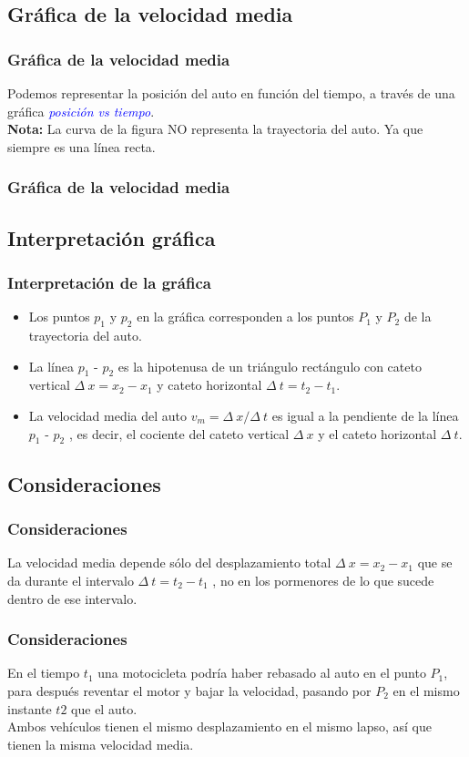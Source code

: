 \subsection*{Gráfica de la velocidad media}
\begin{frame}
\frametitle{Gráfica de la velocidad media}
Podemos representar la posición del auto en función del tiempo, a través de una gráfica \textcolor{blue}{\emph{posición vs tiempo}}.
\\
\bigskip
\pause
\textbf{Nota: } La curva de la figura NO representa la trayectoria del auto. Ya que siempre es una línea recta.
\end{frame}
\begin{frame}[plain]
\frametitle{Gráfica de la velocidad media}
\begin{figure}
    \centering
    
\end{figure}
\end{frame}
\subsection{Interpretación gráfica}
\begin{frame}
\frametitle{Interpretación de la gráfica}
\begin{itemize}[<+->]
\item Los puntos $p_{1}$ y $p_{2}$ en la gráfica corresponden a los puntos $P_{1}$ y $P_{2}$ de la trayectoria del auto.
\item La línea $p_{1}$ - $p_{2}$ es la hipotenusa de un triángulo rectángulo con cateto vertical $\Delta \: x = x_{2} - x_{1}$ y cateto horizontal $\Delta \: t = t_{2} - t_{1}$.
\item La velocidad media del auto $v_{m} = \Delta \: x / \Delta \: t$ es igual a la pendiente de la línea $p_{1}$ - $p_{2}$ , es decir, el cociente del cateto vertical $\Delta \: x$ y el cateto horizontal $\Delta \: t$.
\end{itemize}
\end{frame}
\subsection*{Consideraciones}
\begin{frame}
\frametitle{Consideraciones}
La velocidad media depende sólo del desplazamiento total $\Delta \: x = x_{2} - x_{1}$ que se da durante el intervalo $\Delta \: t = t_{2} - t_{1}$ , no en los pormenores de lo que sucede dentro de ese intervalo.
\end{frame}
\begin{frame}
\frametitle{Consideraciones}
En el tiempo $t_{1}$ una motocicleta podría haber rebasado al auto en el punto $P_{1}$, para después reventar el motor y bajar la velocidad, pasando por $P_{2}$ en el mismo instante $t{2}$ que el auto.
\\
\bigskip
\pause
Ambos vehículos tienen el mismo desplazamiento en el mismo lapso, así que tienen la misma velocidad media.
\end{frame}
